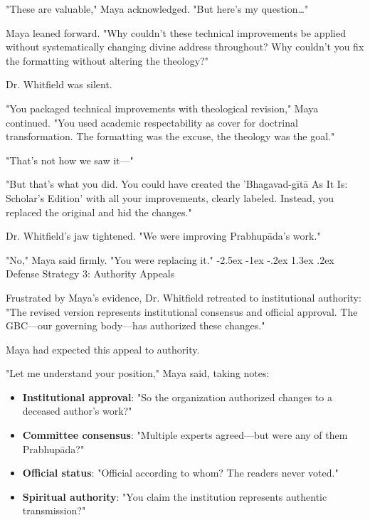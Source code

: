\documentclass[12pt,twoside]{book}
\makeatletter
\renewcommand\section{\@startsection{section}{1}{\z@}%
{-2.5ex \@plus -1ex \@minus -.2ex}%
{1.3ex \@plus.2ex}%
{\normalfont\Large\bfseries}}
\makeatother
\begin{document}
"These are valuable," Maya acknowledged. "But here's my question\ldots{}"

Maya leaned forward. "Why couldn't these technical improvements be applied without systematically changing divine address throughout? Why couldn't you fix the formatting without altering the theology?"

Dr. Whitfield was silent.

"You packaged technical improvements with theological revision," Maya continued. "You used academic respectability as cover for doctrinal transformation. The formatting was the excuse, the theology was the goal."

"That's not how we saw it—"

"But that's what you did. You could have created the 'Bhagavad-gītā As It Is: Scholar's Edition' with all your improvements, clearly labeled. Instead, you replaced the original and hid the changes."

Dr. Whitfield's jaw tightened. "We were improving Prabhupāda's work."

"No," Maya said firmly. "You were replacing it."
\section{Defense Strategy 3: Authority Appeals}
\label{sec:org7a0db29}

Frustrated by Maya's evidence, Dr. Whitfield retreated to institutional authority: "The revised version represents institutional consensus and official approval. The GBC—our governing body—has authorized these changes."

Maya had expected this appeal to authority.

"Let me understand your position," Maya said, taking notes:

\begin{itemize}
\item \textbf{\textbf{Institutional approval}}: "So the organization authorized changes to a deceased author's work?"
\item \textbf{\textbf{Committee consensus}}: "Multiple experts agreed—but were any of them Prabhupāda?"
\item \textbf{\textbf{Official status}}: "Official according to whom? The readers never voted."
\item \textbf{\textbf{Spiritual authority}}: "You claim the institution represents authentic transmission?"
\end{itemize}
\end{document}
